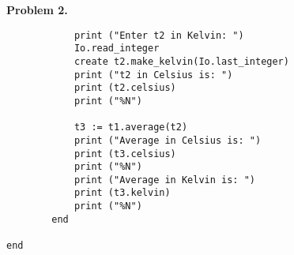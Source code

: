 \documentclass[a4paper,12pt]{article}
\newenvironment{problem}[1]{\par\bigskip\noindent\textbf{Problem #1.}
  \enskip\ignorespaces}{}
\begin{document}
\begin{problem}{2}
\begin{verbatim}
			print ("Enter t2 in Kelvin: ")
			Io.read_integer
			create t2.make_kelvin(Io.last_integer)
			print ("t2 in Celsius is: ")
			print (t2.celsius)
			print ("%N")

			t3 := t1.average(t2)
			print ("Average in Celsius is: ")
			print (t3.celsius)
			print ("%N")
			print ("Average in Kelvin is: ")
			print (t3.kelvin)
			print ("%N")
		end

end
    \end{verbatim}
  \end{problem}
\end{document}
